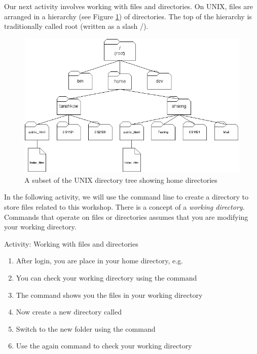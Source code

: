 Our next activity involves working with files and directories. On UNIX, files
are arranged in a hierarchy (see Figure \ref{fig:dir}) of directories.  The top
of the hierarchy is traditionally called root (written as a slash /).

\begin{frame}
\begin{figure}
\begin{center}
\includegraphics[scale=0.4]{file_home}
\end{center}
\caption{A subset of the UNIX directory tree showing home directories}
\label{fig:dir}
\end{figure}
\end{frame}

In the following activity, we will use the command line to create a directory to
store files related to this workshop.  There is a concept of a \emph{working
directory}. Commands that operate on files or directories assumes that you are
modifying your working directory.  

\begin{frame}[fragile]{Activity: Working with files and directories}
\begin{enumerate}
\item After login, you are place in your home directory, e.g. 
\item You can check your working directory using the  command 
\item The  command shows you the files in your working directory 
\item Now create a new directory called  
\item Switch to the new folder using the  command
\item Use the  again command to check your working directory 
\end{enumerate}
\end{frame}

